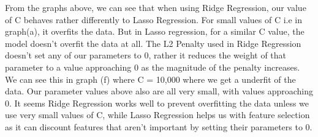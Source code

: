 \documentclass[11pt]{article} %
\begin{document}
\begin{figure}[h]
\qquad
{}
\qquad
{}
\qquad
{}
\end{figure}
From the graphs above, we can see that when using Ridge Regression, our value of C behaves rather differently to Lasso Regression. For small values of C i.e in graph(a), it overfits the data. But in Lasso regression, for a similar C value, the model doesn't overfit the data at all. The L2 Penalty used in Ridge Regression doesn't set any of our parameters to 0, rather it reduces the weight of that parameter to a value approaching 0 as the magnitude of the penalty increases. We can see this in graph (f) where C = 10,000 where we get a underfit of the data. Our parameter values above also are all very small, with values approaching 0. It seems Ridge Regression works well to prevent overfitting the data unless we use very small values of C, while Lasso Regression helps us with feature selection as it can discount features that aren't important by setting their parameters to 0.
\newpage
\end{document}
